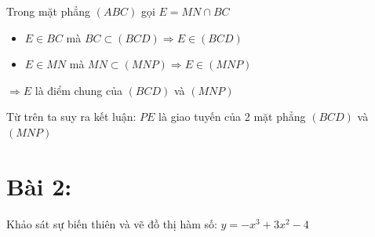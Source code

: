 \documentclass[13pt, a4paper, titlepage]{report}
\begin{document}
\vspace{5mm}
Trong mặt phẳng $(ABC)$ gọi $E = MN \cap BC$
\begin{itemize}
\item $ E \in BC$ mà $BC \subset (BCD) \Rightarrow E \in (BCD)$
\item $ E \in MN$ mà $MN \subset (MNP) \Rightarrow E \in (MNP)$
\end{itemize}
$\Rightarrow E$ là điểm chung của $(BCD)$ và $(MNP)$

\vspace{5mm}
Từ trên ta suy ra kết luận:
$PE$ là giao tuyến của 2 mặt phẳng $(BCD)$ và $(MNP)$

%
\section*{Bài 2:}
Khảo sát sự biến thiên và vẽ đồ thị hàm số: $y = -x^3 + 3x^2 - 4$
\end{document}
